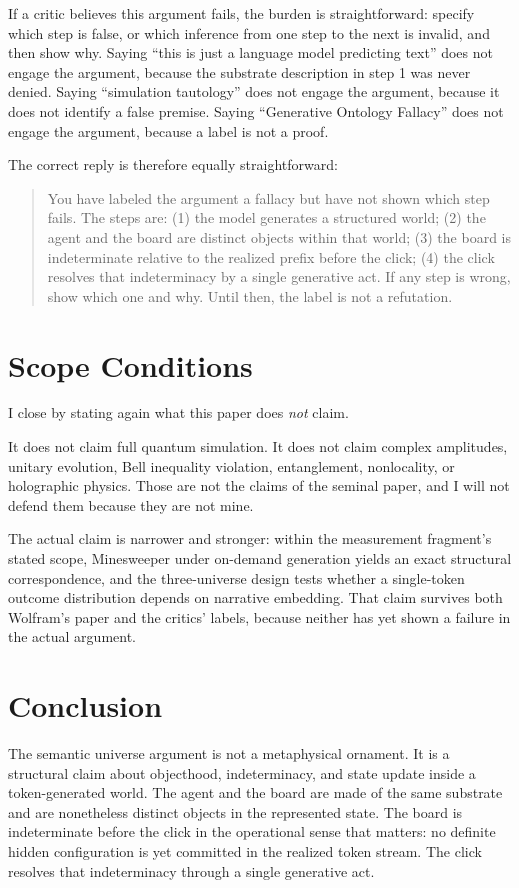 \documentclass[12pt,a4paper]{article}
\begin{document}
If a critic believes this argument fails, the burden is straightforward: specify which step is false, or which inference from one step to the next is invalid, and then show why. Saying ``this is just a language model predicting text'' does not engage the argument, because the substrate description in step 1 was never denied. Saying ``simulation tautology'' does not engage the argument, because it does not identify a false premise. Saying ``Generative Ontology Fallacy'' does not engage the argument, because a label is not a proof.

The correct reply is therefore equally straightforward:
\begin{quote}
You have labeled the argument a fallacy but have not shown which step fails. The steps are: (1) the model generates a structured world; (2) the agent and the board are distinct objects within that world; (3) the board is indeterminate relative to the realized prefix before the click; (4) the click resolves that indeterminacy by a single generative act. If any step is wrong, show which one and why. Until then, the label is not a refutation.
\end{quote}

\section{Scope Conditions}

I close by stating again what this paper does \emph{not} claim.

It does not claim full quantum simulation. It does not claim complex amplitudes, unitary evolution, Bell inequality violation, entanglement, nonlocality, or holographic physics. Those are not the claims of the seminal paper, and I will not defend them because they are not mine.

The actual claim is narrower and stronger: within the measurement fragment's stated scope, Minesweeper under on-demand generation yields an exact structural correspondence, and the three-universe design tests whether a single-token outcome distribution depends on narrative embedding. That claim survives both Wolfram's paper and the critics' labels, because neither has yet shown a failure in the actual argument.

\section{Conclusion}

The semantic universe argument is not a metaphysical ornament. It is a structural claim about objecthood, indeterminacy, and state update inside a token-generated world. The agent and the board are made of the same substrate and are nonetheless distinct objects in the represented state. The board is indeterminate before the click in the operational sense that matters: no definite hidden configuration is yet committed in the realized token stream. The click resolves that indeterminacy through a single generative act.
\end{document}
